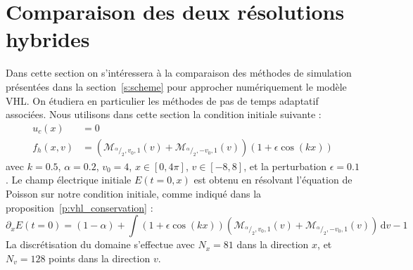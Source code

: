 
\section{Comparaison des deux résolutions hybrides}
\label{s:compare}

Dans cette section on s'intéressera à la comparaison des méthodes de simulation présentées dans la section~\ref{s:scheme} pour 
approcher num\'eriquement le mod\`ele VHL. On \'etudiera en particulier les méthodes de pas de temps adaptatif associées. 
Nous utilisons dans cette section la condition initiale suivante :
$$
  \begin{aligned}
    u_c(x)   &= 0 \\
    f_h(x,v) &=  \left(\mathcal{M}_{^\alpha/_2,v_0,1}(v) +  \mathcal{M}_{^\alpha/_2,-v_0,1}(v) \right)(1 + \epsilon\cos(kx))
  \end{aligned}
$$
avec $k=0.5$, $\alpha=0.2$, $v_0 = 4$, $x\in [0,4\pi]$, $v\in[-8,8]$, et la perturbation $\epsilon = 0.1$. Le champ électrique initiale $E(t=0,x)$ est obtenu en résolvant l'équation de Poisson sur notre condition initiale, comme indiqué dans la proposition~\ref{p:vhl_conservation} :
$$
  \partial_x E(t=0) = (1-\alpha) + \int (1+\epsilon\cos(kx))\left( \mathcal{M}_{^\alpha/_2,v_0,1}(v) + \mathcal{M}_{^\alpha/_2,-v_0,1}(v) \right)\,\mathrm{d}v - 1
$$
La discrétisation du domaine s'effectue avec $N_x=81$ dans la direction $x$, et $N_v=128$ points dans la direction $v$.

